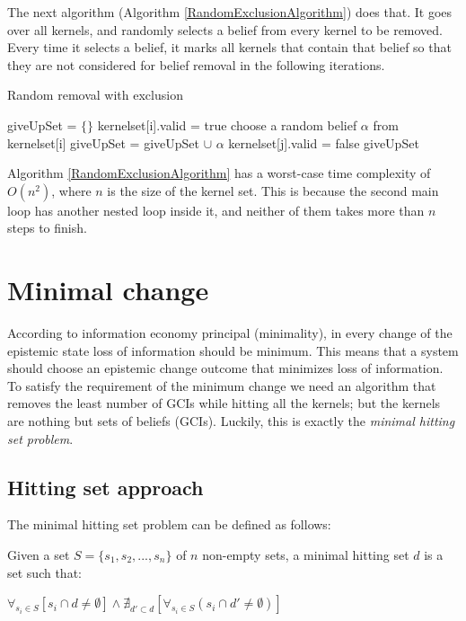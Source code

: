 The next algorithm (Algorithm \ref{RandomExclusionAlgorithm}) does that. It goes over all kernels, and randomly selects a belief from every kernel to be removed. Every time it selects a belief, it marks all kernels that contain that belief so that they are not considered for belief removal in the following iterations. 

\begin{algorithm}
\caption{Random removal with exclusion}
\label{RandomExclusionAlgorithm}
\begin{algorithmic}[1]
\State giveUpSet = $\lbrace \rbrace$
\State kernelset[i].valid = true
\EndFor \State
{}
\State choose a random belief $\alpha$ from kernelset[i]
\State giveUpSet = giveUpSet $\cup$ $\alpha$
\State kernelset[j].valid = false
\EndIf
\EndFor
\EndIf
\EndFor \State
\Return giveUpSet
\EndFunction
\end{algorithmic}
\end{algorithm}

Algorithm \ref{RandomExclusionAlgorithm} has a worst-case time complexity of $O(n^2)$, where $n$ is the size of the kernel set. This is because the second main loop has another nested loop inside it, and neither of them takes more than $n$ steps to finish. 

\section{Minimal change}
According to information economy principal (minimality), in every change of the epistemic state loss of information should be minimum\cite{econ}. This means that a system should choose an epistemic change outcome that minimizes loss of information. To satisfy the requirement of the minimum change we need an algorithm that removes the least number of GCIs while hitting all the kernels; but the kernels are nothing but sets of beliefs (GCIs). Luckily, this is exactly the \textit{minimal hitting set problem}. 

\subsection{Hitting set approach}
The minimal hitting set problem can be defined as follows:
\begin{defn}
Given a set $S=\{s_{1}, s_{2}, ..., s_{n}\}$ of $n$ non-empty sets, a minimal hitting set $d$ is a set such that:
\begin{center}
$\forall_{s_{i} \in S} [ s_{i} \cap d \neq \emptyset] \wedge \nexists_{d' \subset d}[\forall_{s_{i} \in S} (s_{i} \cap d' \neq \emptyset) ]$\cite{hit}
\end{center}
\end{defn}

